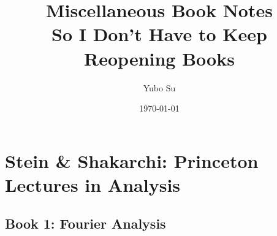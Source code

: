 \documentclass[11pt,
        usenames, %
        dvipsnames %
    ]{report}
\begin{document}
\def\Snospace~{\S{}} %
\renewcommand*{\sectionautorefname}{\Snospace}
\renewcommand*{\appendixautorefname}{\Snospace}
\renewcommand*{\figureautorefname}{Fig.}
\renewcommand*{\equationautorefname}{Eq.}
\renewcommand*{\tableautorefname}{Tab.}

\pagestyle{fancy}
\rhead{}
\cfoot{\thepage/\pageref{LastPage}}

\title{Miscellaneous Book Notes\\
So I Don't Have to Keep Reopening Books}
\author{Yubo Su}
\date{\today}

\maketitle

\chapter{Stein \& Shakarchi: Princeton Lectures in Analysis}

\section{Book 1: Fourier Analysis}
\end{document}
